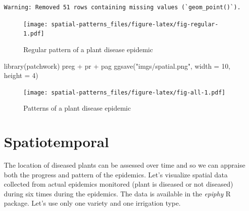 \documentclass[
  letterpaper,
]{book}
\newenvironment{Shaded}{\begin{snugshade}}{\end{snugshade}}
\newcommand{\AttributeTok}[1]{\textcolor[rgb]{0.40,0.45,0.13}{#1}}
\newcommand{\DecValTok}[1]{\textcolor[rgb]{0.68,0.00,0.00}{#1}}
\newcommand{\FunctionTok}[1]{\textcolor[rgb]{0.28,0.35,0.67}{#1}}
\newcommand{\NormalTok}[1]{\textcolor[rgb]{0.00,0.23,0.31}{#1}}
\newcommand{\SpecialCharTok}[1]{\textcolor[rgb]{0.37,0.37,0.37}{#1}}
\newcommand{\StringTok}[1]{\textcolor[rgb]{0.13,0.47,0.30}{#1}}
\begin{document}
\begin{verbatim}
Warning: Removed 51 rows containing missing values (`geom_point()`).
\end{verbatim}

\begin{figure}

\texttt{[image: spatial-patterns\_files/figure-latex/fig-regular-1.pdf]} \hfill{}

\caption{\label{fig-regular}Regular pattern of a plant disease epidemic}

\end{figure}

\begin{Shaded}
\begin{Highlighting}[]
\FunctionTok{library}\NormalTok{(patchwork)}
\NormalTok{preg }\SpecialCharTok{+}\NormalTok{ pr }\SpecialCharTok{+}\NormalTok{ pag}
\FunctionTok{ggsave}\NormalTok{(}\StringTok{"imgs/spatial.png"}\NormalTok{, }\AttributeTok{width =} \DecValTok{10}\NormalTok{, }\AttributeTok{height =} \DecValTok{4}\NormalTok{)}
\end{Highlighting}
\end{Shaded}

\begin{figure}

\texttt{[image: spatial-patterns\_files/figure-latex/fig-all-1.pdf]} \hfill{}

\caption{\label{fig-all}Patterns of a plant disease epidemic}

\end{figure}

\hypertarget{spatiotemporal}{%
\section{Spatiotemporal}\label{spatiotemporal}}

The location of diseased plants can be assessed over time and so we can
appraise both the progress and pattern of the epidemics. Let's visualize
spatial data collected from actual epidemics monitored (plant is
diseased or not diseased) during six times during the epidemics. The
data is available in the \emph{epiphy} R package. Let's use only one
variety and one irrigation type.
\end{document}
